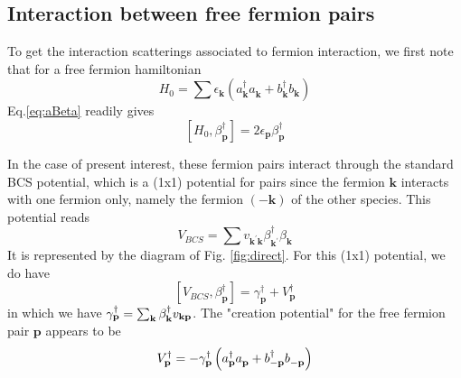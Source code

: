 \documentclass[aps,prb,superscriptaddress,twocolumn]{revtex4}
\newcommand{\vk}{\ensuremath{\mathbf{k}}}
\newcommand{\vp}{\ensuremath{\mathbf{p}}}
\begin{document}
\subsection{Interaction between free fermion pairs}

To get the interaction scatterings associated to fermion interaction, we
first note that for a free fermion hamiltonian 
\begin{equation}  \label{eq:h0}
H_0=\sum{\epsilon_\vk\left(a^{\dagger}_{\mathbf{k} } a^{}_{\mathbf{k}
}+b^{\dagger}_{\mathbf{k} } b^{}_{\mathbf{k} }\right) }
\end{equation}
Eq.\eqref{eq:aBeta} readily gives 
\begin{equation}  \label{eq:betaH}
\left[H_0,\beta^{\dagger}_\vp\right]  =2\epsilon_\vp\beta^{\dagger}_\vp
\end{equation}

In the case of present interest, these fermion pairs interact through the
standard BCS potential, which is a (1x1) potential for pairs since the fermion $\mathbf{k}$ 
interacts with one fermion only, namely the fermion $\left(-\mathbf{k} \right) $ of the other
species. This potential reads 
\begin{equation}  \label{eq:vbcs}
V_{BCS}=\sum{v_{\mathbf{k} ^{\prime}\mathbf{k} }\beta^{\dagger}_{\mathbf{k}
^{\prime}}\beta^{}_{\mathbf{k} }}
\end{equation}
It is represented by the diagram of Fig. \ref{fig:direct}. For this (1x1)
potential, we do have 
\begin{equation}  \label{eq:vbeta}
\left[V_{BCS},\beta^{\dagger}_\vp\right] 
=\gamma^{\dagger}_\vp+V^{\dagger}_\vp
\end{equation}
in which we have $\gamma^{\dagger}_\vp=\sum_\vk\beta^{\dagger}_\vk{}v_{%
\mathbf{k} \mathbf{p} }$. The "creation potential" for the free fermion pair 
$\mathbf{p} $ appears to be 
\begin{equation}  \label{eq:betaV}
V^{\dagger}_\vp=-{\gamma^{\dagger}_\vp}\left(a^{\dagger}_{\mathbf{p} }a^{}_{%
\mathbf{p} }+b^{\dagger}_{-\mathbf{p} }b^{}_{-\mathbf{p} }\right) 
\end{equation}
\end{document}
